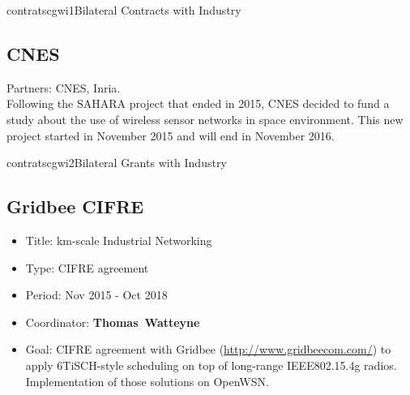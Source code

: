 \documentclass{ra2016}
\newcommand{\thomas}  {\textbf{Thomas~Watteyne}}
\begin{document}
\begin{module}{contrats}{cgwi1}{Bilateral Contracts with Industry}

\subsection{CNES}

\begin{participants}
\end{participants}

Partners: CNES, Inria.\\

Following the SAHARA project that ended in 2015, CNES decided to fund a study about the use of wireless sensor networks in space environment.
This new project started in November 2015 and will end in November 2016.

\end{module}



\begin{module}{contrats}{cgwi2}{Bilateral Grants with Industry}

\subsection{Gridbee CIFRE}

\begin{participants}
\end{participants}

\begin{itemize}
    \item Title: km-scale Industrial Networking
    \item Type: CIFRE agreement
    \item Period: Nov 2015 - Oct 2018
    \item Coordinator: \thomas
    \item Goal: CIFRE agreement with Gridbee (\url{http://www.gridbeecom.com/}) to apply 6TiSCH-style scheduling on top of long-range IEEE802.15.4g radios. Implementation of those solutions on OpenWSN.
\end{itemize}



\end{module}
\end{document}

